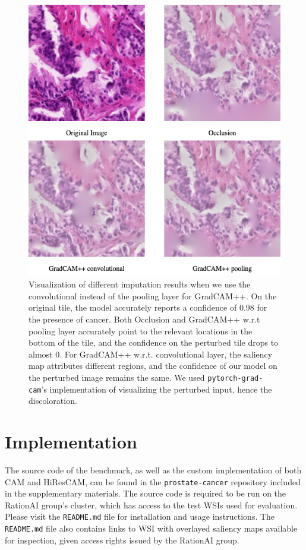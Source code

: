 \begin{figure}
    \begin{center}
    \begin{minipage}{0.7\textwidth}
      \includegraphics[width=\textwidth]{img/gradcampp-road-conv-vs-pool.png}
    \end{minipage}
    \caption{
    Visualization of different imputation results when we use the convolutional instead of the pooling layer for GradCAM++.
    On the original tile, the model accurately reports a confidence of $0.98$ for the presence of cancer.
    Both Occlusion and GradCAM++ w.r.t pooling layer accurately point to the relevant locations in the bottom of the tile, and the confidence on the perturbed tile drops to almost $0$.
    For GradCAM++ w.r.t. convolutional layer, the saliency map attributes different regions, and the confidence of our model on the perturbed image remains the same.
    We used \texttt{pytorch-grad-cam}'s implementation of visualizing the perturbed input, hence the discoloration.
    }
    \label{fig:gradcampp-road-conv-vs-pool}
    \end{center}
\end{figure}

\pagebreak

\section{Implementation}\label{sec:imple}

The source code of the benchmark, as well as the custom implementation of both CAM and HiResCAM, can be found in the \texttt{prostate-cancer} repository included in the supplementary materials. The source code is required to be run on the RationAI group's cluster, which has access to the test WSIs used for evaluation. Please visit the \texttt{README.md} file for installation and usage instructions. The \texttt{README.md} file also contains links to WSI with overlayed saliency maps available for inspection, given access rights issued by the RationAI group.
